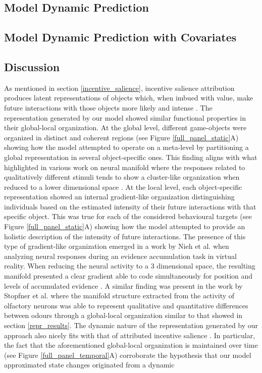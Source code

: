 \subsection{Model Dynamic Prediction}
\lorem

\subsection{Model Dynamic Prediction with Covariates}
\lorem

\subsection{Discussion}
As mentioned in section  \ref{incentive_salience}, incentive salience attribution produces latent representations of objects which, when imbued with value, make future interactions with those objects more likely and intense \cite{berridge1998role,berridge2004motivation}. The representation generated by our model showed similar functional properties in their global-local organization. At the global level, different game-objects were organized in distinct and coherent regions (see Figure \ref{full_panel_static}A) showing how the model attempted to operate on a meta-level by partitioning a global representation in several object-specific ones. This finding aligns with what highlighted in various work on neural manifold where the responses related to qualitatively different stimuli tends to show a cluster-like organization when reduced to a lower dimensional space \cite{stopfer2003intensity, gallego2017neural, ganmor2015thesaurus}. At the local level, each object-specific representation showed an internal gradient-like organization distinguishing individuals based on the estimated intensity of their future interactions with that specific object. This was true for each of the considered behavioural targets (see Figure \ref{full_panel_static}A) showing how the model attempted to provide an holistic description of the intensity of future interactions. The presence of this type of gradient-like organization emerged in a work by Nieh et al. \cite{nieh2021geometry} when analyzing neural responses during an evidence accumulation task in virtual reality. When reducing the neural activity to a 3 dimensional space, the resulting manifold presented a clear gradient able to code simultaneously for position and levels of accumulated evidence \cite{nieh2021geometry}. A similar finding was present in the work by Stopfner et al. \cite{stopfer2003intensity} where the manifold structure extracted from the activity of olfactory neurons was able to represent qualitative and quantitative differences between odours through a global-local organization similar to that showed in section \ref{repr_results}. The dynamic nature of the representation generated by our approach also nicely fits with that of attributed incentive salience \cite{toates1994comparing,robinson1993neural,zhang2009neural,tindell2009dynamic,berridge2012prediction}. In particular, the fact that the aforementioned global-local organization is maintained over time (see Figure \ref{full_panel_temporal}A) corroborate the hypothesis that our model approximated state changes originated from a dynamic 